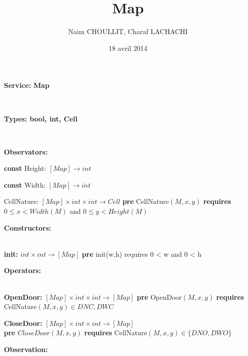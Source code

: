 \documentclass[11pt]{article}
\title{Map}
\author{Naim CHOULLIT, Charaf LACHACHI}
\date{18 avril 2014}
\begin{document}
\maketitle

\setcounter{tocdepth}{3}
\tableofcontents

\vspace*{1cm}
\begin{huge}
\textbf{Service:	Map}
\end{huge}\\

\begin{large}
\textbf{Types:	bool, int, Cell} 
\end{large}\\
 
\begin{large}
\textbf{Observators:} 
\end{large}

\textbf{const} Height: $[Map] \rightarrow int$

\textbf{const} Width: $[Map] \rightarrow int$

CellNature: $[Map] \times int \times int \rightarrow Cell$ 
\textbf{pre} CellNature$(M,x,y)$  \textbf{requires} $ 0 \leq x < Width(M)$  and $ 0 \leq y < Height(M)$\\

\begin{large}
\textbf{Constructors:} 
\end{large}\\

\textbf{init:} $int \times int \rightarrow [Map]$
\textbf{pre} init(w,h) requires 0 < w and 0 < h\\

\begin{large}
\textbf{Operators:} 
\end{large}\\

\textbf{OpenDoor:} $[Map] \times int \times int \rightarrow [Map]$
\textbf{pre} OpenDoor$(M,x,y)$ \textbf{requires} CellNature$(M,x,y) \in {DNC, DWC }$

\textbf{CloseDoor:} $[Map] \times int \times int \rightarrow [Map]$\\ \textbf{pre} $CloseDoor(M,x,y)$ \textbf{requires} CellNature$(M,x,y) \in \{DNO, DWO\}$\\

\begin{large}
\textbf{Observation:} 
\end{large}\\
\end{document}
